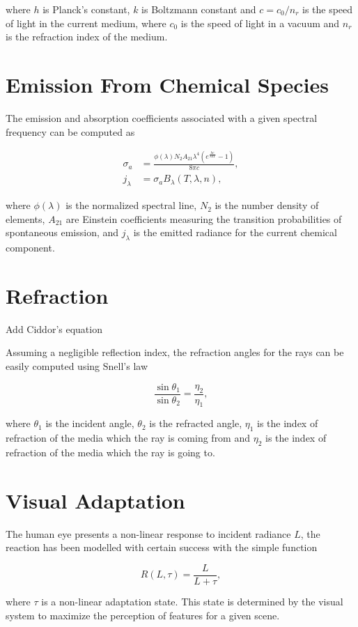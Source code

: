 where $h$ is Planck's constant, $k$ is Boltzmann constant and $c =  c_0 / n_r$ is the speed of light in the current medium, where $c_0$ is the speed of light in a vacuum and $n_r$ is the refraction index of the medium.

\section{Emission From Chemical Species}
\label{sec:emission_from_chemical_species}

The emission and absorption coefficients associated with a given spectral frequency can be computed as


\begin{align}
\sigma_a &= \frac{\phi(\lambda) N_2 A_{21} \lambda^4 (e ^\frac{h c}{\lambda k T} - 1)}{8 \pi c}, \\
j_\lambda &= \sigma_a B_\lambda (T, \lambda, n), 
\end{align}

where $\phi(\lambda)$ is the normalized spectral line, $N_2$ is the number density of elements, $A_{21}$ are Einstein coefficients measuring the transition probabilities of spontaneous emission, and $j_\lambda$ is the emitted radiance for the current chemical component.

\section{Refraction}
\label{sec:refraction}

Add Ciddor's equation

Assuming a negligible reflection index, the refraction angles for the rays can be easily computed using Snell's law

\begin{equation}
\frac{\sin \theta_1}{\sin \theta_2} = \frac{\eta_2}{\eta_1},
\end{equation}

where $\theta_1$ is the incident angle, $\theta_2$ is the refracted angle, $\eta_1$ is the index of refraction of the media which the ray is coming from and $\eta_2$ is the index of refraction of the media which the ray is going to.

\section{Visual Adaptation}
\label{sec:visual_adaptation}

The human eye presents a non-linear response to incident radiance $L$, the reaction has been modelled  with certain success with the simple function 

\begin{equation}
R(L, \tau) = \frac{L}{L + \tau},
\end{equation}

where $\tau$ is a non-linear adaptation state.
This state is determined by the visual system to maximize the perception of features for a given scene.
